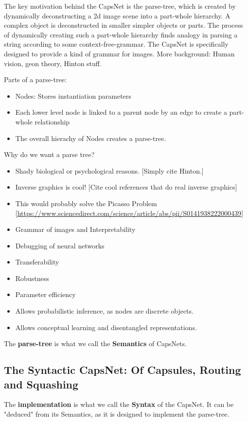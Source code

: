 \documentclass{article}
\begin{document}
The key motivation behind the CapsNet is the parse-tree, which is created by dynamically deconstructing a 2d image scene into a part-whole hierarchy. A complex object is deconstructed in smaller simpler objects or parts.
The process of dynamically creating such a part-whole hierarchy finds analogy in parsing a string according to some context-free-grammar.
The CapsNet is specifically designed to provide a kind of grammar for images.
More background: Human vision, geon theory, Hinton stuff.

Parts of a parse-tree:
\begin{itemize}
	\item Nodes: Stores instantiation parameters
	\item Each lower level node is linked to a parent node by an edge to create a part-whole relationship
	\item The overall hierachy of Nodes creates a parse-tree.
\end{itemize}
Why do we want a parse tree?
\begin{itemize}
	\item Shady biological or psychological reasons. [Simply cite Hinton.]
	\item Inverse graphics is cool! [Cite cool references that do real inverse graphics]
	\item This would probably solve the Picasso Problem [\url{https://www.sciencedirect.com/science/article/abs/pii/S0141938222000439}]
	\item Grammar of images and Interpretability
	\item Debugging of neural networks
	\item Transferability
	\item Robustness
	\item Parameter efficiency
	\item Allows probabilistic inference, as nodes are discrete objects.
	\item Allows conceptual learning and disentangled representations.
\end{itemize}

The \textbf{parse-tree} is what we call the \textbf{Semantics} of CapsNets.

\subsection{The Syntactic CapsNet: Of Capsules, Routing and Squashing}
The \textbf{implementation} is what we call the \textbf{Syntax} of the CapsNet.
It can be "deduced" from its Semantics, as it is designed to implement the parse-tree.
\end{document}
